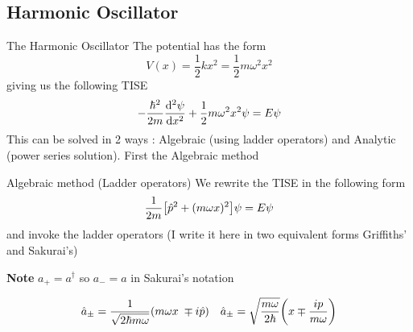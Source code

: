 \subsection{Harmonic Oscillator}
\begin{frame}{The Harmonic Oscillator}
	The potential has the form $$ V(x) = \frac 12 kx^2 = \frac 12 m\omega^2 x^2$$ giving us the following TISE
	$$-\frac{\hbar^2}{2m} \dv[2]{\psi}{x} + \frac 12 m\omega^2x^2 \psi = E \psi$$
	This can be solved in 2 ways : Algebraic (using ladder operators) and Analytic  (power series solution).
	First the Algebraic method
\end{frame}
\begin{frame}{Algebraic method (Ladder operators)}
	We rewrite the TISE in the following form
	\[
		\frac{1}{2m} \qty[\hat{p}^2 + (m\omega x)^2]\psi =E\psi
	\]
	and invoke the ladder operators (I write it here in two equivalent forms Griffiths' and Sakurai's)

	\textbf{Note} $a_+ = a^\dag$ so $a_- = a$ in Sakurai's notation


	\begin{align*}
		\hat{a}_{\pm} = \frac{1}{\sqrt{2\hbar m \omega }} (m\omega x \; \mp i \hat p) &  & \hat{a}_{\pm} = \sqrt{\frac{m\omega}{2\hbar}} \qty(x \mp \frac{i p }{m\omega})
	\end{align*}

\end{frame}
